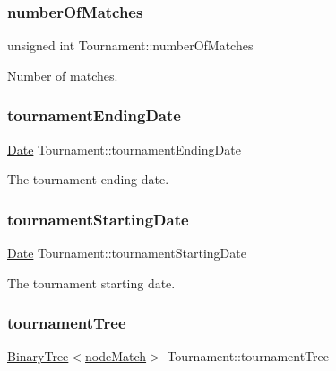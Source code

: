 \subsubsection{\texorpdfstring{number\+Of\+Matches}{numberOfMatches}}
{\footnotesize\ttfamily unsigned int Tournament\+::number\+Of\+Matches\hspace{0.3cm}{\ttfamily [private]}}



Number of matches. 

\hypertarget{class_tournament_a85027b414ba2ddd7cd513c399588d2a8}{}\label{class_tournament_a85027b414ba2ddd7cd513c399588d2a8} 
\subsubsection{\texorpdfstring{tournament\+Ending\+Date}{tournamentEndingDate}}
{\footnotesize\ttfamily \hyperlink{class_date}{Date} Tournament\+::tournament\+Ending\+Date\hspace{0.3cm}{\ttfamily [private]}}



The tournament ending date. 

\hypertarget{class_tournament_afe5c5994c15194a320914831d05e40fc}{}\label{class_tournament_afe5c5994c15194a320914831d05e40fc} 
\subsubsection{\texorpdfstring{tournament\+Starting\+Date}{tournamentStartingDate}}
{\footnotesize\ttfamily \hyperlink{class_date}{Date} Tournament\+::tournament\+Starting\+Date\hspace{0.3cm}{\ttfamily [private]}}



The tournament starting date. 

\hypertarget{class_tournament_a561cd3b82b192558910f85ae1c1f5bea}{}\label{class_tournament_a561cd3b82b192558910f85ae1c1f5bea} 
\subsubsection{\texorpdfstring{tournament\+Tree}{tournamentTree}}
{\footnotesize\ttfamily \hyperlink{class_binary_tree}{Binary\+Tree}$<$\hyperlink{_tournament_8hpp_a59a90f79e961bd9bc490adbf767f7cc4}{node\+Match}$>$ Tournament\+::tournament\+Tree\hspace{0.3cm}{\ttfamily [private]}}



